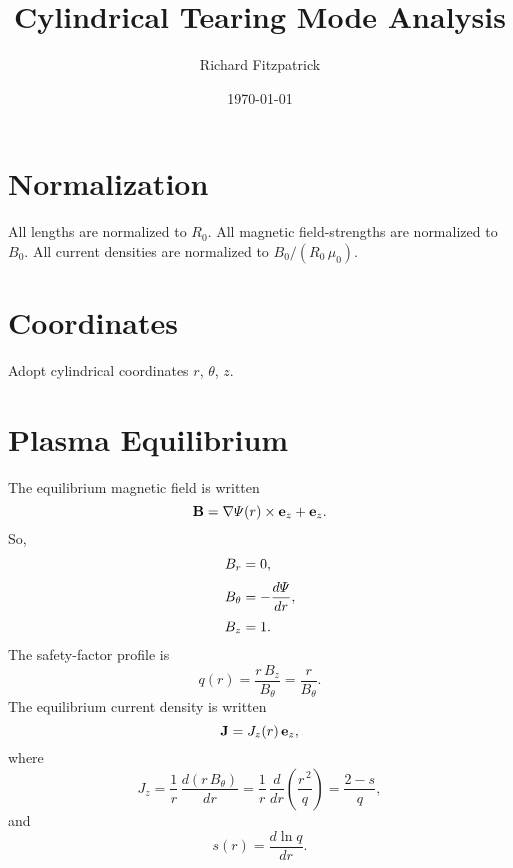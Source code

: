 \documentclass[notitlepage,12pt]{article}
\title{\bf Cylindrical Tearing Mode Analysis}
\date{\today}
\author{Richard Fitzpatrick}
\begin{document}
\maketitle

\section{Normalization}
All lengths are normalized to $R_0$. All magnetic field-strengths are normalized to $B_0$. All current densities are
normalized to $B_0/(R_0\,\mu_0)$. 

\section{Coordinates}
Adopt cylindrical coordinates $r$, $\theta$, $z$. 

\section{Plasma Equilibrium}
The equilibrium magnetic field is written
\begin{equation}
{\bf B} = \nabla{\mit\Psi}(r)\times{\bf e}_z + {\bf e}_z.
\end{equation}
So, 
\begin{align}
B_r &= 0,\\[0.5ex]
B_\theta &= -\frac{d{\mit\Psi}}{dr},\\[0.5ex]
B_z &= 1.
\end{align}
The safety-factor profile is
\begin{equation}
q(r) = \frac{r\,B_z}{B_\theta}= \frac{r}{B_\theta}.
\end{equation}
The equilibrium current density is written
\begin{equation}
{\bf J} = J_z(r)\,{\bf e}_z,
\end{equation}
where
\begin{equation}\label{e7}
J_z = \frac{1}{r}\,\frac{d(r\,B_\theta)}{dr} =\frac{1}{r}\,\frac{d}{dr}\!\left(\frac{r^{\,2}}{q}\right)=\frac{2-s}{q},
\end{equation}
and
\begin{equation}
s(r) = \frac{d\ln q}{dr}.
\end{equation}
\end{document}
